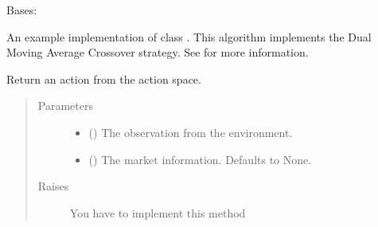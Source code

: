\documentclass[letterpaper,10pt,english]{sphinxmanual}
\begin{document}
\begin{fulllineitems}
\label{\detokenize{Algorithm:crypto_env.algorithm.MovingAverage}}
\sphinxAtStartPar
Bases: {\hyperref[\detokenize{Algorithm:crypto_env.algorithm.Algorithm}]{}}

\sphinxAtStartPar
An example implementation of class {\hyperref[\detokenize{Algorithm:crypto_env.algorithm.Algorithm}]{}}. This algorithm implements the Dual Moving Average Crossover strategy. See  for more information.

\begin{fulllineitems}
\label{\detokenize{Algorithm:crypto_env.algorithm.MovingAverage.take_action}}
\sphinxAtStartPar
Return an action from the action space.
\begin{quote}\begin{description}
\item[{Parameters}] \leavevmode\begin{itemize}
\item {} 
\sphinxAtStartPar
{} () \textendash{} The observation from the environment.

\item {} 
\sphinxAtStartPar
{} (\sphinxstyleliteralemphasis{\sphinxupquote{, }}) \textendash{} The market information. Defaults to None.

\end{itemize}

\item[{Raises}] \leavevmode
\sphinxAtStartPar
{} \textendash{} You have to implement this method

\end{description}\end{quote}

\end{fulllineitems}


\end{fulllineitems}
\end{document}
